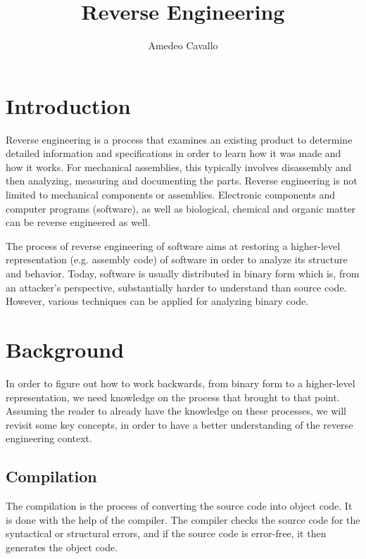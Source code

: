 \documentclass{article}
\author{Amedeo Cavallo}
\title{Reverse Engineering}
\date{}
\begin{document}
 

\maketitle

\section{Introduction}

Reverse engineering is a process that examines an existing product to determine detailed information 
and specifications in order to learn how it was made and how it works. For mechanical assemblies, this typically 
involves disassembly and then analyzing, measuring and documenting the parts. Reverse engineering is not limited 
to mechanical components or assemblies. Electronic components and computer programs (software), as well as biological, 
chemical and organic matter can be reverse engineered as well. \citep{reveng}

The process of reverse engineering of software aims at restoring a higher-level representation (e.g. assembly code) 
of software in order to analyze its structure and behavior. Today, software is usually distributed in binary form 
which is, from an attacker’s perspective, substantially harder to understand than source code.
However, various techniques can be applied for analyzing binary code. \citep{codeobf}

\section{Background}

In order to figure out how to work backwards, from binary form to a higher-level representation, we need knowledge 
on the process that brought to that point. Assuming the reader to already have the knowledge on these processes,
we will revisit some key concepts, in order to have a better understanding of the reverse engineering context.

\subsection{Compilation}

The compilation is the process of converting the source code into object code. It is done with the help of the compiler. 
The compiler checks the source code for the syntactical or structural errors, and if the source code is error-free, 
it then generates the object code. \citep{compil}
\end{document}
